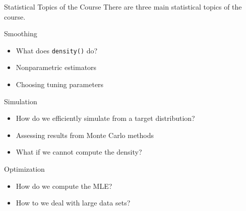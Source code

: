 \documentclass[
  ignorenonframetext,
  aspectratio=1610,
  onlytextwidth]{beamer}
\providecommand{\tightlist}{}
\begin{document}
\begin{frame}[fragile]{Statistical Topics of the Course}
\label{statistical-topics-of-the-course}
There are three main statistical topics of the course.

\begin{block}{Smoothing}
\label{smoothing}
\begin{itemize}[<+->]
\tightlist
\item
  What does \texttt{density()} do?
\item
  Nonparametric estimators
\item
  Choosing tuning parameters
\end{itemize}

\pause
\end{block}

\begin{block}{Simulation}
\label{simulation}
\begin{itemize}[<+->]
\tightlist
\item
  How do we efficiently simulate from a target distribution?
\item
  Assessing results from Monte Carlo methods
\item
  What if we cannot compute the density?
\end{itemize}

\pause
\end{block}

\begin{block}{Optimization}
\label{optimization}
\begin{itemize}[<+->]
\tightlist
\item
  How do we compute the MLE?
\item
  How to we deal with large data sets?
\end{itemize}
\end{block}
\end{frame}
\end{document}

